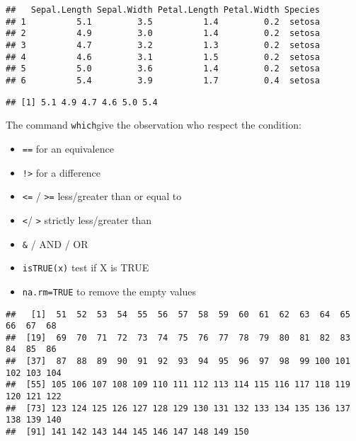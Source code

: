 \documentclass[
]{article}
\newenvironment{Shaded}{\begin{snugshade}}{\end{snugshade}}
\newcommand{\FunctionTok}[1]{\textcolor[rgb]{0.13,0.29,0.53}{\textbf{#1}}}
\newcommand{\NormalTok}[1]{#1}
\newcommand{\SpecialCharTok}[1]{\textcolor[rgb]{0.81,0.36,0.00}{\textbf{#1}}}
\newcommand{\StringTok}[1]{\textcolor[rgb]{0.31,0.60,0.02}{#1}}
\providecommand{\tightlist}{%
  \setlength{\itemsep}{0pt}\setlength{\parskip}{0pt}}
\begin{document}
\begin{verbatim}
##   Sepal.Length Sepal.Width Petal.Length Petal.Width Species
## 1          5.1         3.5          1.4         0.2  setosa
## 2          4.9         3.0          1.4         0.2  setosa
## 3          4.7         3.2          1.3         0.2  setosa
## 4          4.6         3.1          1.5         0.2  setosa
## 5          5.0         3.6          1.4         0.2  setosa
## 6          5.4         3.9          1.7         0.4  setosa
\end{verbatim}

\begin{Shaded}
\end{Shaded}

\begin{verbatim}
## [1] 5.1 4.9 4.7 4.6 5.0 5.4
\end{verbatim}

The command \texttt{which}give the observation who respect the
condition:

\begin{itemize}
\tightlist
\item
  \texttt{==} for an equivalence
\item
  \texttt{!\textgreater{}} for a difference
\item
  \texttt{\textless{}=} / \texttt{\textgreater{}=} less/greater than or
  equal to
\item
  \texttt{\textless{}}/ \texttt{\textgreater{}} strictly less/greater
  than
\item
  \texttt{\&} / \texttt{\textbar{}} AND / OR
\item
  \texttt{isTRUE(x)} test if X is TRUE
\item
  \texttt{na.rm=TRUE} to remove the empty values
\end{itemize}

\begin{Shaded}
\end{Shaded}

\begin{verbatim}
##   [1]  51  52  53  54  55  56  57  58  59  60  61  62  63  64  65  66  67  68
##  [19]  69  70  71  72  73  74  75  76  77  78  79  80  81  82  83  84  85  86
##  [37]  87  88  89  90  91  92  93  94  95  96  97  98  99 100 101 102 103 104
##  [55] 105 106 107 108 109 110 111 112 113 114 115 116 117 118 119 120 121 122
##  [73] 123 124 125 126 127 128 129 130 131 132 133 134 135 136 137 138 139 140
##  [91] 141 142 143 144 145 146 147 148 149 150
\end{verbatim}
\end{document}
